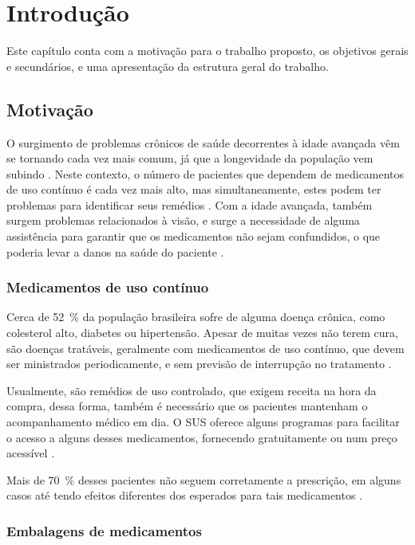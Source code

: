 \chapter{Introdução}


Este capítulo conta com a motivação para o trabalho proposto, os objetivos gerais e secundários, e uma apresentação da estrutura geral do trabalho.

\section{Motivação}

O surgimento de problemas crônicos de saúde decorrentes à idade avançada vêm se tornando cada vez mais comum, já que a longevidade da população vem subindo \cite{medico24hs2021}.
Neste contexto, o número de pacientes que dependem de medicamentos de uso contínuo é cada vez mais alto, mas simultaneamente, estes podem ter problemas para identificar seus remédios \cite{porto2023}.
Com a idade avançada, também surgem problemas relacionados à visão, e surge a necessidade de alguma assistência para garantir que os medicamentos não sejam confundidos, o que poderia levar a danos na saúde do paciente \cite{ione2017}.

\subsection{Medicamentos de uso contínuo}

Cerca de \SI{52}{\percent} da população brasileira sofre de alguma doença crônica, como colesterol alto, diabetes ou hipertensão.
Apesar de muitas vezes não terem cura, são doenças tratáveis, geralmente com medicamentos de uso contínuo, que devem ser ministrados periodicamente, e sem previsão de interrupção no tratamento \cite{porto2023}.

Usualmente, são remédios de uso controlado, que exigem receita na hora da compra, dessa forma, também é necessário que os pacientes mantenham o acompanhamento médico em dia.
O \ac{SUS} oferece alguns programas para facilitar o acesso a alguns desses medicamentos, fornecendo gratuitamente ou num preço acessível \cite{porto2023}.

Mais de \SI{70}{\percent} desses pacientes não seguem corretamente a prescrição, em alguns casos até tendo efeitos diferentes dos esperados para tais medicamentos \cite{porto2023}.

\subsection{Embalagens de medicamentos}

